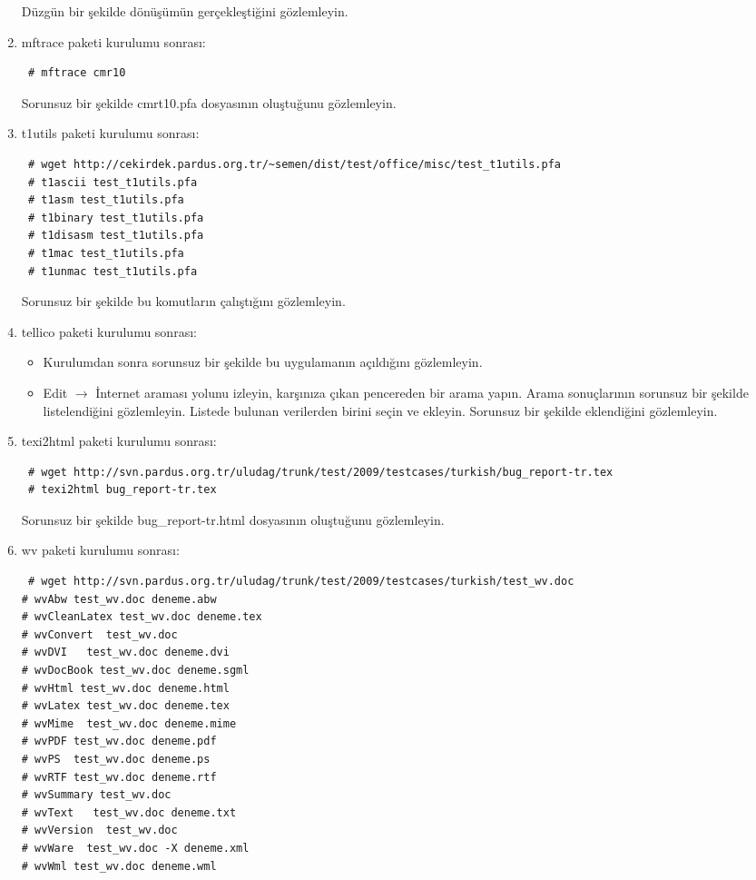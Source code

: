 \documentclass[a4paper,10pt]{article}
\begin{document}
\begin{enumerate}
Düzgün bir şekilde dönüşümün gerçekleştiğini gözlemleyin.
\item mftrace paketi kurulumu sonrası:
\begin{verbatim}
 # mftrace cmr10
\end{verbatim}
Sorunsuz bir şekilde cmrt10.pfa dosyasının oluştuğunu gözlemleyin.
\item t1utils paketi kurulumu sonrası:
\begin{verbatim}
 # wget http://cekirdek.pardus.org.tr/~semen/dist/test/office/misc/test_t1utils.pfa
 # t1ascii test_t1utils.pfa
 # t1asm test_t1utils.pfa
 # t1binary test_t1utils.pfa
 # t1disasm test_t1utils.pfa
 # t1mac test_t1utils.pfa
 # t1unmac test_t1utils.pfa
\end{verbatim}

Sorunsuz bir şekilde bu komutların çalıştığını gözlemleyin. 
\item tellico paketi kurulumu sonrası:

\begin{itemize}
 \item Kurulumdan sonra sorunsuz bir şekilde bu uygulamanın açıldığını gözlemleyin.
 \item Edit $\rightarrow$ İnternet araması yolunu izleyin, karşınıza çıkan pencereden bir arama yapın. Arama sonuçlarının sorunsuz bir şekilde listelendiğini gözlemleyin. Listede bulunan verilerden birini seçin ve ekleyin. Sorunsuz bir şekilde eklendiğini gözlemleyin.
\end{itemize}

\item texi2html paketi kurulumu sonrası:
\begin{verbatim}
 # wget http://svn.pardus.org.tr/uludag/trunk/test/2009/testcases/turkish/bug_report-tr.tex
 # texi2html bug_report-tr.tex
\end{verbatim}

Sorunsuz bir şekilde bug\_report-tr.html dosyasının oluştuğunu gözlemleyin.

\item wv paketi kurulumu sonrası:
\begin{verbatim}
 # wget http://svn.pardus.org.tr/uludag/trunk/test/2009/testcases/turkish/test_wv.doc
# wvAbw test_wv.doc deneme.abw                                
# wvCleanLatex test_wv.doc deneme.tex                            
# wvConvert  test_wv.doc                              
# wvDVI   test_wv.doc deneme.dvi                                
# wvDocBook test_wv.doc deneme.sgml                               
# wvHtml test_wv.doc deneme.html                                 
# wvLatex test_wv.doc deneme.tex                                
# wvMime  test_wv.doc deneme.mime                                
# wvPDF test_wv.doc deneme.pdf                                  
# wvPS  test_wv.doc deneme.ps                                  
# wvRTF test_wv.doc deneme.rtf                                  
# wvSummary test_wv.doc            
# wvText   test_wv.doc deneme.txt                               
# wvVersion  test_wv.doc                             
# wvWare  test_wv.doc -X deneme.xml                                
# wvWml test_wv.doc deneme.wml       


\end{verbatim}
\end{enumerate}
\end{document}
